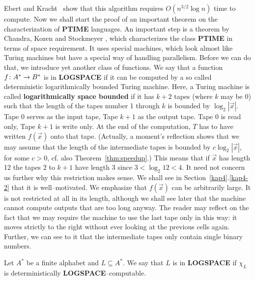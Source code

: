 Ebert and Kracht~ 
show that this algorithm requires $O(n^{3/2} \log n)$ time to 
compute.  Now we shall start the proof of an important 
theorem on the characterization of \textbf{PTIME} languages. An 
important step is a theorem by Chandra, Kozen and Stockmeyer
, which characterizes the class
\textbf{PTIME} in terms of space requirement. It uses 
special machines, which look almost like Turing machines
but have a special way of handling parallelism. Before we can
do that, we introduce yet another class of functions. We say that a
function $f \colon A^{\ast} \rightarrow B^{\ast}$ is in \textbf{LOGSPACE} if
it can be computed by a so called deterministic logarithmically
bounded Turing machine. Here, a Turing machine is called
\textbf{logarithmically space bounded} if it has $k + 2$ tapes (where
$k$ may be $0$) such that the length of the tapes
number 1 through $k$ is bounded by $\log_2 |\vec{x}|$.
Tape 0 serves as the input tape, Tape $k+1$ as the output tape.
Tape 0 is read only, Tape $k+1$ is write only. At the end of the
computation, $T$ has to have written $f(\vec{x})$ onto that tape.
(Actually, a moment's reflection shows that we may assume that the
length of the intermediate tapes is bounded by $c \log_2 |\vec{x}|$, 
for some $c > 0$, cf. also Theorem~\ref{thm:speedup}.) This means 
that if $\vec{x}$ has length 12 the tapes $2$ to $k + 1$ have length 
$3$ since $3 < \log_2 12 < 4$. It need not concern us further why 
this restriction makes sense.  We shall see in 
Section~\ref{kap4}.\ref{kap4-2} that it is well--motivated. We 
emphasize that $f(\vec{x})$ can be arbitrarily large. It is
not restricted at all in its length, although we shall see later
that the machine cannot compute outputs that are too long
anyway. The reader may reflect on the fact that we may require
the machine to use the last tape only in this way: it moves
strictly to the right without ever looking at the previous cells
again. Further, we can see to it that the intermediate tapes
only contain single binary numbers.
\begin{defn}
Let $A^{\ast}$ be a finite alphabet and $L \subseteq
A^{\ast}$. We say that $L$ is in \textbf{LOGSPACE} if
$\chi_L$ is deterministically \textbf{LOGSPACE}--computable.
\end{defn}

